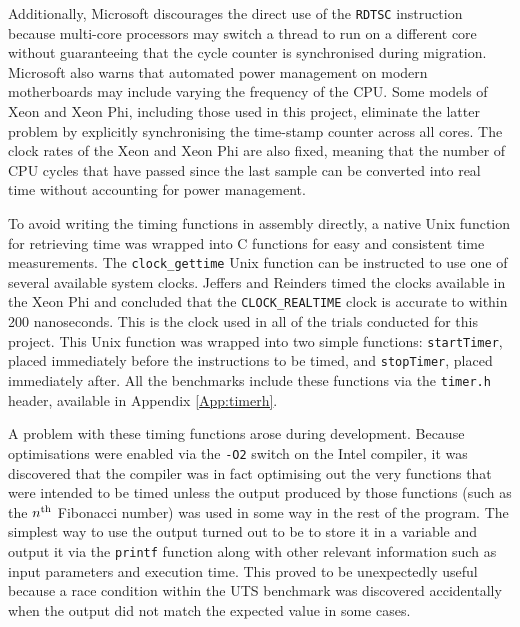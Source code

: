 \documentclass{report}
\begin{document}
Additionally, Microsoft discourages the direct use of the \verb!RDTSC! instruction because multi-core processors may switch a thread to run on a different core without guaranteeing that the cycle counter is synchronised during migration\cite{GameTiming}. Microsoft also warns that automated power management on modern motherboards may include varying the frequency of the CPU. Some models of Xeon and Xeon Phi, including those used in this project, eliminate the latter problem by explicitly synchronising the time-stamp counter across all cores\cite{Jeffers13}. The clock rates of the Xeon and Xeon Phi are also fixed, meaning that the number of CPU cycles that have passed since the last sample can be converted into real time without accounting for power management.

To avoid writing the timing functions in assembly directly, a native Unix function for retrieving time was wrapped into C functions for easy and consistent time measurements. The \verb!clock_gettime! Unix function can be instructed to use one of several available system clocks. Jeffers and Reinders\cite{Jeffers13} timed the clocks available in the Xeon Phi and concluded that the \verb!CLOCK_REALTIME! clock is accurate to within 200 nanoseconds. This is the clock used in all of the trials conducted for this project. This Unix function was wrapped into two simple functions: \verb!startTimer!, placed immediately before the instructions to be timed, and \verb!stopTimer!, placed immediately after. All the benchmarks include these functions via the \verb!timer.h! header, available in Appendix \ref{App:timerh}.

A problem with these timing functions arose during development. Because optimisations were enabled via the \verb!-O2! switch on the Intel compiler, it was discovered that the compiler was in fact optimising out the very functions that were intended to be timed unless the output produced by those functions (such as the \(n\textsuperscript{th}\) Fibonacci number) was used in some way in the rest of the program. The simplest way to use the output turned out to be to store it in a variable and output it via the \verb!printf! function along with other relevant information such as input parameters and execution time. This proved to be unexpectedly useful because a race condition within the UTS benchmark was discovered accidentally when the output did not match the expected value in some cases.
\end{document}

